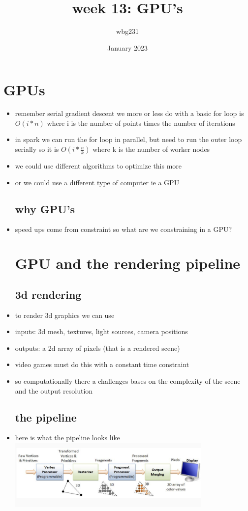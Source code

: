 \documentclass{article}
\title{week 13: GPU's }
\author{wbg231 }
\date{January 2023}
\begin{document}
\maketitle

\section{GPUs}
\begin{itemize}
\subsection*{gradient descent}
\item remember serial gradient descent we more or less do with a basic for loop is $O(i*n)$ where i is the number of points times the number of iterations
\item in spark we can run the for loop in parallel, but need to run the outer loop serially so it is $O(i*\frac{n}{k})$ where k is the number of worker nodes  
\item we could use different algorithms to optimize this more 
\item or we could use a different type of computer ie a GPU
\subsection*{why GPU's}
\item speed ups come from constraint so what are we constraining in a GPU?
\section*{GPU and the rendering pipeline }
\subsection*{3d rendering}
\item to render 3d graphics we can use
\item  inputs: 3d mesh, textures, light sources, camera positions 
\item outputs: a 2d array of pixels (that is a rendered scene) 
\item video games must do this with a constant time constraint 
\item so computationally there a challenges bases on the complexity of the scene and the output resolution 
\subsection*{the pipeline}
\item here is what the pipeline looks like \\ \includegraphics*[width=10cm]{images/Screenshot 2023-05-11 at 11.17.53 PM.png}

\end{itemize}
\end{document}
